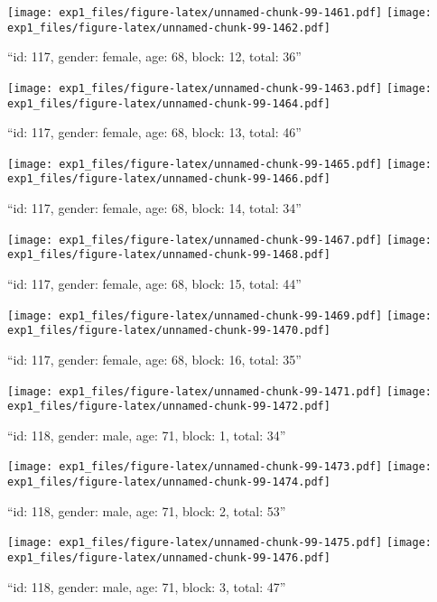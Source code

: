 \documentclass[,]{article}
\begin{document}
\texttt{[image: exp1\_files/figure-latex/unnamed-chunk-99-1461.pdf]}
\texttt{[image: exp1\_files/figure-latex/unnamed-chunk-99-1462.pdf]}

\newpage
[1] 

``id: 117, gender: female, age: 68, block: 12, total: 36''

\texttt{[image: exp1\_files/figure-latex/unnamed-chunk-99-1463.pdf]}
\texttt{[image: exp1\_files/figure-latex/unnamed-chunk-99-1464.pdf]}

\newpage
[1] 

``id: 117, gender: female, age: 68, block: 13, total: 46''

\texttt{[image: exp1\_files/figure-latex/unnamed-chunk-99-1465.pdf]}
\texttt{[image: exp1\_files/figure-latex/unnamed-chunk-99-1466.pdf]}

\newpage
[1] 

``id: 117, gender: female, age: 68, block: 14, total: 34''

\texttt{[image: exp1\_files/figure-latex/unnamed-chunk-99-1467.pdf]}
\texttt{[image: exp1\_files/figure-latex/unnamed-chunk-99-1468.pdf]}

\newpage
[1] 

``id: 117, gender: female, age: 68, block: 15, total: 44''

\texttt{[image: exp1\_files/figure-latex/unnamed-chunk-99-1469.pdf]}
\texttt{[image: exp1\_files/figure-latex/unnamed-chunk-99-1470.pdf]}

\newpage
[1] 

``id: 117, gender: female, age: 68, block: 16, total: 35''

\texttt{[image: exp1\_files/figure-latex/unnamed-chunk-99-1471.pdf]}
\texttt{[image: exp1\_files/figure-latex/unnamed-chunk-99-1472.pdf]}

\newpage
[1] 

``id: 118, gender: male, age: 71, block: 1, total: 34''

\texttt{[image: exp1\_files/figure-latex/unnamed-chunk-99-1473.pdf]}
\texttt{[image: exp1\_files/figure-latex/unnamed-chunk-99-1474.pdf]}

\newpage
[1] 

``id: 118, gender: male, age: 71, block: 2, total: 53''

\texttt{[image: exp1\_files/figure-latex/unnamed-chunk-99-1475.pdf]}
\texttt{[image: exp1\_files/figure-latex/unnamed-chunk-99-1476.pdf]}

\newpage
[1] 

``id: 118, gender: male, age: 71, block: 3, total: 47''
\end{document}
